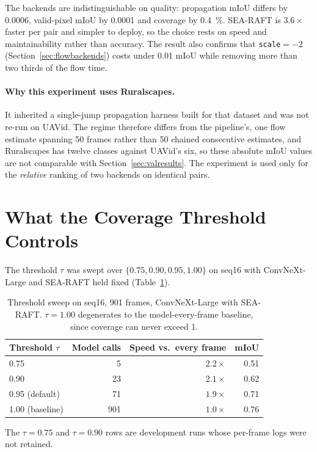 \documentclass[report.tex]{subfiles}
\begin{document}
The backends are indistinguishable on quality: propagation mIoU differs by
\num{0.0006}, valid-pixel mIoU by \num{0.0001} and coverage by
\SI{0.4}{\percent}. SEA-RAFT is $3.6\times$ faster per pair and simpler to
deploy, so the choice rests on speed and maintainability rather than accuracy.
The result also confirms that \texttt{scale}${=}{-}2$
(Section~\ref{sec:flowbackends}) costs under \num{0.01} mIoU while removing
more than two thirds of the flow time.

\paragraph{Why this experiment uses Ruralscapes.} It inherited a single-jump
propagation harness built for that dataset and was not re-run on UAVid. The
regime therefore differs from the pipeline's, one flow estimate spanning 50
frames rather than 50 chained consecutive estimates, and Ruralscapes has
twelve classes against UAVid's six, so these absolute mIoU values are not
comparable with Section~\ref{sec:valresults}. The experiment is used only for
the \emph{relative} ranking of two backends on identical pairs.

\section{What the Coverage Threshold Controls}
\label{sec:sweep}

The threshold $\tau$ was swept over $\{0.75, 0.90, 0.95, 1.00\}$ on seq16 with
ConvNeXt-Large and SEA-RAFT held fixed (Table~\ref{tab:sweep}).

\begin{table}[t]
    \centering
    \caption[Coverage threshold sweep]{Threshold sweep on seq16, 901 frames,
    ConvNeXt-Large with SEA-RAFT. $\tau = 1.00$ degenerates to the
    model-every-frame baseline, since coverage can never exceed 1.}
    \label{tab:sweep}
    \footnotesize
    \begin{tabular}{@{}lrrr@{}}
        \toprule
        \textbf{Threshold $\tau$} & \textbf{Model calls}
        & \textbf{Speed vs.\ every frame} & \textbf{mIoU} \\
        \midrule
        0.75            &   5 & $2.2\times$ & 0.51 \\
        0.90            &  23 & $2.1\times$ & 0.62 \\
        0.95 (default)  &  71 & $1.9\times$ & 0.71 \\
        1.00 (baseline) & 901 & $1.0\times$ & 0.76 \\
        \bottomrule
    \end{tabular}

    \vspace{1mm}
    \footnotesize\raggedright
    The $\tau = 0.75$ and $\tau = 0.90$ rows are development runs whose
    per-frame logs were not retained.
\end{table}
\end{document}

